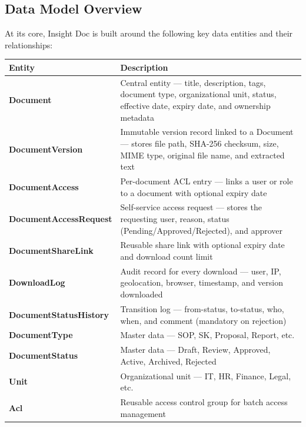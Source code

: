 \subsection{Data Model Overview}

At its core, Insight Doc is built around the following key data
entities and their relationships:

\begin{tabularx}{\textwidth}{@{} l X @{}}
  \toprule
  \textbf{Entity} & \textbf{Description} \\
  \midrule
  \textbf{Document}
    & Central entity --- title, description, tags, document
      type, organizational unit, status, effective date,
      expiry date, and ownership metadata \\
  \textbf{DocumentVersion}
    & Immutable version record linked to a Document --- stores
      file path, SHA-256 checksum, size, MIME type, original
      file name, and extracted text \\
  \textbf{DocumentAccess}
    & Per-document ACL entry --- links a user or role to a
      document with optional expiry date \\
  \textbf{DocumentAccessRequest}
    & Self-service access request --- stores the requesting
      user, reason, status (Pending/Approved/Rejected),
      and approver \\
  \textbf{DocumentShareLink}
    & Reusable share link with optional expiry date and
      download count limit \\
  \textbf{DownloadLog}
    & Audit record for every download --- user, IP, geolocation,
      browser, timestamp, and version downloaded \\
  \textbf{DocumentStatusHistory}
    & Transition log --- from-status, to-status, who, when,
      and comment (mandatory on rejection) \\
  \textbf{DocumentType}
    & Master data --- SOP, SK, Proposal, Report, etc. \\
  \textbf{DocumentStatus}
    & Master data --- Draft, Review, Approved, Active,
      Archived, Rejected \\
  \textbf{Unit}
    & Organizational unit --- IT, HR, Finance, Legal, etc. \\
  \textbf{Acl}
    & Reusable access control group for batch access
      management \\
  \bottomrule
\end{tabularx}

